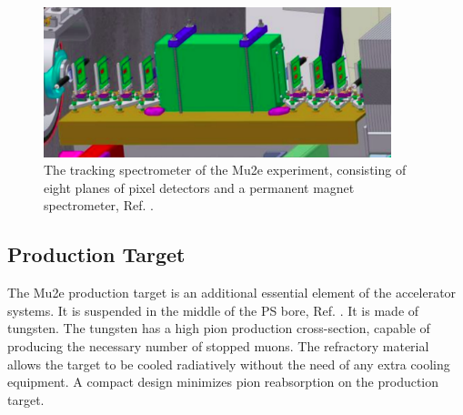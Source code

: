 \begin{figure}[!h]
\centering
\includegraphics[width =0.9\textwidth]{figures/png/Screenshot_20240306_184720.png}
\caption{The tracking spectrometer of the Mu2e experiment, consisting of eight planes of pixel detectors and a permanent magnet spectrometer, Ref. \cite{Prebys:IPAC2015-THPF121}.}
\label{fig:extintionmonitor}
\end{figure}
\subsection{Production Target}
The Mu2e production target is an additional essential element of the accelerator systems. It is suspended in the middle of the PS bore, Ref. \cite{bartoszek2015mu2e}. It is made of tungsten. The tungsten has a high pion production cross-section, capable of producing the necessary number of stopped muons. The refractory material allows the target to be cooled radiatively without the need of any extra cooling equipment. A compact design minimizes pion reabsorption on the production target.
